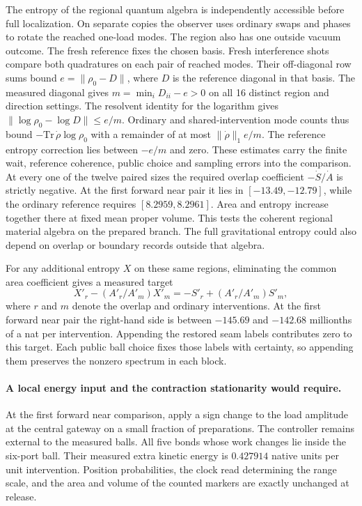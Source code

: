 \documentclass[11pt]{article}
\begin{document}
The entropy of the regional quantum algebra is independently accessible
before full localization. On separate copies the observer uses ordinary
swaps and phases to rotate the reached one-load modes. The region also
has one outside vacuum outcome. The fresh reference fixes the chosen
basis. Fresh interference shots compare both quadratures on each pair
of reached modes. Their off-diagonal row sums bound
$e=\|\rho_0-D\|$, where $D$ is the reference diagonal in that basis.
The measured diagonal gives $m=\min_i D_{ii}-e>0$ on all 16 distinct
region and direction settings. The resolvent identity for the logarithm
gives $\|\log\rho_0-\log D\|\le e/m$. Ordinary and shared-intervention
mode counts thus bound $-\mathrm{Tr}\,\dot\rho\log\rho_0$ with a remainder
of at most $\|\dot\rho\|_1 e/m$. The reference entropy correction lies
between $-e/m$ and zero. These estimates carry the finite wait,
reference coherence, public choice and sampling errors into the comparison.
At every one of the twelve paired sizes the required overlap coefficient
$-\dot S/\dot A$ is strictly negative. At the first forward near pair it
lies in $[-13.49,-12.79]$, while the ordinary reference requires
$[8.2959,8.2961]$. Area and entropy increase together there at fixed
mean proper volume. This tests the coherent regional material algebra on
the prepared branch. The full gravitational entropy could also depend
on overlap or boundary records outside that algebra.

For any additional entropy $X$ on these same regions, eliminating the
common area coefficient gives a measured target
\[
 X'_r-(A'_r/A'_m)X'_m=-S'_r+(A'_r/A'_m)S'_m,
\]
where $r$ and $m$ denote the overlap and ordinary interventions.
At the first forward near pair the right-hand side is between $-145.69$
and $-142.68$ millionths of a nat per intervention. Appending the restored
seam labels contributes zero to this target. Each public ball choice
fixes those labels with certainty, so appending them preserves the
nonzero spectrum in each block.

\paragraph{A local energy input and the contraction stationarity would require.}
At the first forward near comparison, apply a sign change to the load
amplitude at the central gateway on a small fraction of preparations.
The controller remains external to the measured balls. All five bonds
whose work changes lie inside the six-port ball. Their measured extra
kinetic energy is $0.427914$ native units per unit intervention. Position
probabilities, the clock read determining the range scale, and the
area and volume of the counted markers are exactly unchanged at release.
\end{document}
